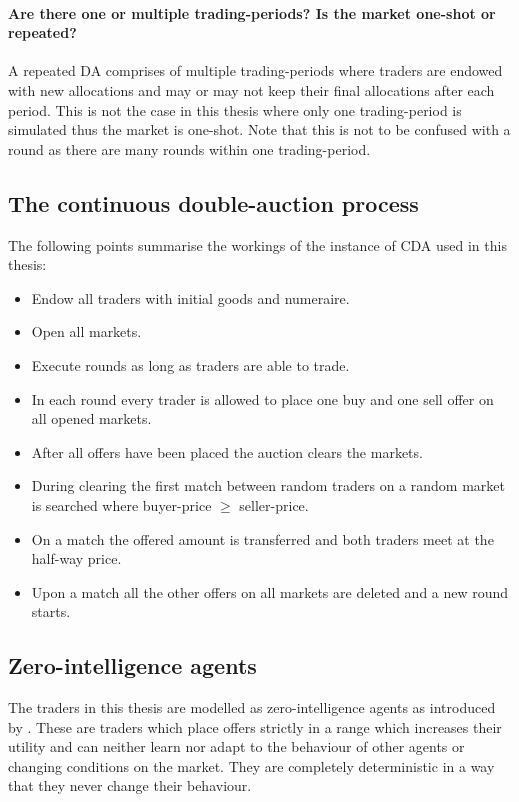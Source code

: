 \documentclass[../Bachelorarbeit.tex]{subfiles}
\begin{document}
\paragraph{Are there one or multiple trading-periods? Is the market one-shot or repeated?} A repeated DA comprises of multiple trading-periods where traders are endowed with new allocations and may or may not keep their final allocations after each period. This is not the case in this thesis where only one trading-period is simulated thus the market is one-shot. Note that this is not to be confused with a \gls{round} as there are many rounds within one trading-period.

\subsection{The continuous double-auction process}

The following points summarise the workings of the instance of CDA used in this thesis:

\begin{itemize}
\item Endow all traders with initial goods and numeraire.
\item Open all markets.
\item Execute rounds as long as traders are able to trade.
\item In each round every trader is allowed to place one buy and one sell offer on all opened markets.
\item After all offers have been placed the auction clears the markets.
\item During clearing the first match between random traders on a random market is searched where buyer-price $\geq$ seller-price.
\item On a match the offered amount is transferred and both traders meet at the half-way price.
\item Upon a match all the other offers on all markets are deleted and a new round starts.
\end{itemize}

\subsection{Zero-intelligence agents}
\label{sec:ZERO_INTELLIGENCE_AGENTS}
The traders in this thesis are modelled as zero-intelligence agents as introduced by \cite{GodeSunder1993}. These are traders which place offers strictly in a range which increases their utility and can neither learn nor adapt to the behaviour of other agents or changing conditions on the market. They are completely deterministic in a way that they never change their behaviour. 
\end{document}
